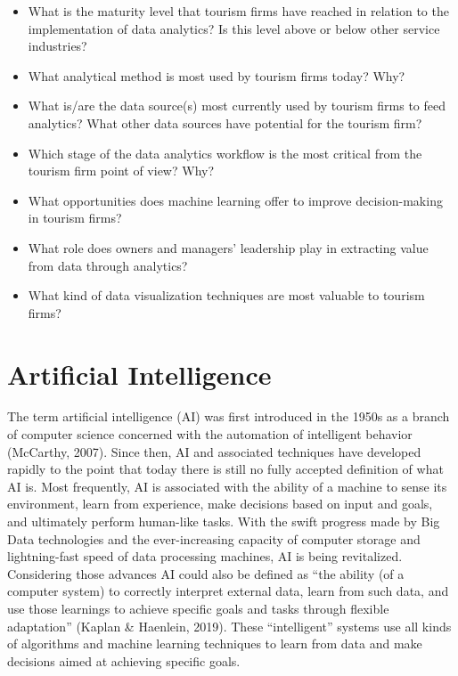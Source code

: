 \documentclass[
  letterpaper,
  DIV=11,
  numbers=noendperiod]{scrreprt}
\begin{document}
\begin{itemize}
\item
  What is the maturity level that tourism firms have reached in relation
  to the implementation of data analytics? Is this level above or below
  other service industries?
\item
  What analytical method is most used by tourism firms today? Why?
\item
  What is/are the data source(s) most currently used by tourism firms to
  feed analytics? What other data sources have potential for the tourism
  firm?
\item
  Which stage of the data analytics workflow is the most critical from
  the tourism firm point of view? Why?
\item
  What opportunities does machine learning offer to improve
  decision-making in tourism firms?
\item
  What role does owners and managers' leadership play in extracting
  value from data through analytics?
\item
  What kind of data visualization techniques are most valuable to
  tourism firms?
\end{itemize}

\hypertarget{artificial-intelligence}{%
\chapter{Artificial Intelligence}\label{artificial-intelligence}}

The term artificial intelligence (AI) was first introduced in the 1950s
as a branch of computer science concerned with the automation of
intelligent behavior (McCarthy, 2007). Since then, AI and associated
techniques have developed rapidly to the point that today there is still
no fully accepted definition of what AI is. Most frequently, AI is
associated with the ability of a machine to sense its environment, learn
from experience, make decisions based on input and goals, and ultimately
perform human-like tasks. With the swift progress made by Big Data
technologies and the ever-increasing capacity of computer storage and
lightning-fast speed of data processing machines, AI is being
revitalized. Considering those advances AI could also be defined as
``the ability (of a computer system) to correctly interpret external
data, learn from such data, and use those learnings to achieve specific
goals and tasks through flexible adaptation'' (Kaplan \& Haenlein,
2019). These ``intelligent'' systems use all kinds of algorithms and
machine learning techniques to learn from data and make decisions aimed
at achieving specific goals.
\end{document}

